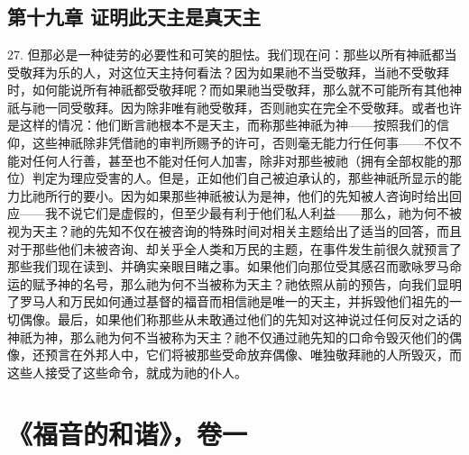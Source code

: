 
\section{}


\subsection{第十九章 证明此天主是真天主}

27. 但那必是一种徒劳的必要性和可笑的胆怯。我们现在问：那些以所有神祇都当受敬拜为乐的人，对这位天主持何看法？因为如果祂不当受敬拜，当祂不受敬拜时，如何能说所有神祇都受敬拜呢？而如果祂当受敬拜，那么就不可能所有其他神祇与祂一同受敬拜。因为除非唯有祂受敬拜，否则祂实在完全不受敬拜。或者也许是这样的情况：他们断言祂根本不是天主，而称那些神祇为神——按照我们的信仰，这些神祇除非凭借祂的审判所赐予的许可，否则毫无能力行任何事——不仅不能对任何人行善，甚至也不能对任何人加害，除非对那些被祂（拥有全部权能的那位）判定为理应受害的人。但是，正如他们自己被迫承认的，那些神祇所显示的能力比祂所行的要小。因为如果那些神祇被认为是神，他们的先知被人咨询时给出回应——我不说它们是虚假的，但至少最有利于他们私人利益——那么，祂为何不被视为天主？祂的先知不仅在被咨询的特殊时间对相关主题给出了适当的回答，而且对于那些他们未被咨询、却关乎全人类和万民的主题，在事件发生前很久就预言了那些我们现在读到、并确实亲眼目睹之事。如果他们向那位受其感召而歌咏罗马命运的赋予神的名号，那么祂为何不当被称为天主？祂依照从前的预告，向我们显明了罗马人和万民如何通过基督的福音而相信祂是唯一的天主，并拆毁他们祖先的一切偶像。最后，如果他们称那些从未敢通过他们的先知对这神说过任何反对之话的神祇为神，那么祂为何不当被称为天主？祂不仅通过祂先知的口命令毁灭他们的偶像，还预言在外邦人中，它们将被那些受命放弃偶像、唯独敬拜祂的人所毁灭，而这些人接受了这些命令，就成为祂的仆人。\par



\section{《福音的和谐》，卷一}

